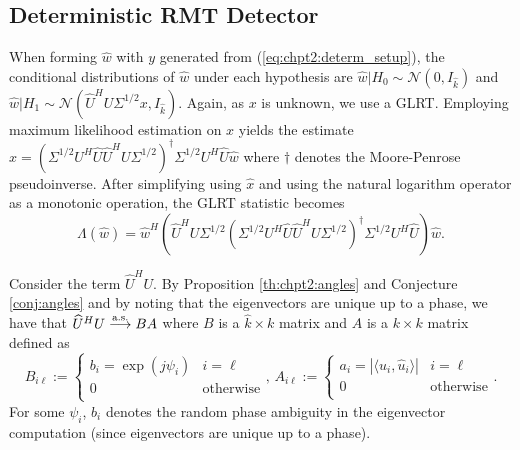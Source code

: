 \subsection{Deterministic RMT Detector}\label{sec:ieee_msd_rmt_detec_determ}

When forming $\widehat{w}$ with $y$ generated from (\ref{eq:chpt2:determ_setup}), the conditional distributions of $\widehat{w}$ under each hypothesis are $\widehat{w}|H_0\sim\mathcal{N}(0,I_{\widehat{k}})$ and $\widehat{w}|H_1\sim\mathcal{N}(\widehat{U}^HU\Sigma^{1/2} x, I_{\widehat{k}})$. Again, as $x$ is unknown, we use a GLRT. Employing maximum likelihood estimation on $x$ yields the estimate $\widehat{x}=\left(\Sigma^{1/2} U^H\widehat{U}\widehat{U}^HU\Sigma^{1/2}\right)^{\dagger}\Sigma^{1/2} U^H\widehat{U}\widehat{w}$ where $\dagger$ denotes the Moore-Penrose pseudoinverse. After simplifying using $\widehat{x}$ and using the natural logarithm operator as a monotonic operation, the GLRT statistic becomes
\begin{equation*}
\Lambda(\widehat{w}) = \widehat{w}^H\left(\widehat{U}^HU\Sigma^{1/2}\left(\Sigma^{1/2} U^H\widehat{U}\widehat{U}^HU\Sigma^{1/2}\right)^{\dagger}\Sigma^{1/2} U^H\widehat{U}\right)\widehat{w}.
\end{equation*}

Consider the term $\widehat{U}^HU$. By Proposition \ref{th:chpt2:angles} and Conjecture \ref{conj:angles} and by noting that the eigenvectors are unique up to a phase, we have that $\widehat{U}^HU \overset{\textrm{a.s.}}{\longrightarrow} BA$ where $B$ is a $\widehat{k}\times k$ matrix and $A$ is a $k \times k$ matrix defined as
\small\begin{equation*}
B_{i\ell}:=\begin{cases} b_i=\exp(j\psi_i) & i=\ell \\ 0 & \text{otherwise} \\ \end{cases},\,A_{i\ell}:=\begin{cases} a_i=|\langle u_i,\widehat{u}_i\rangle| & i=\ell \\ 0 & \text{otherwise} \\ \end{cases}.
\end{equation*}\normalsize
For some $\psi_{i}$, $b_i$ denotes the random phase ambiguity in the eigenvector computation (since eigenvectors are unique up to a phase).

